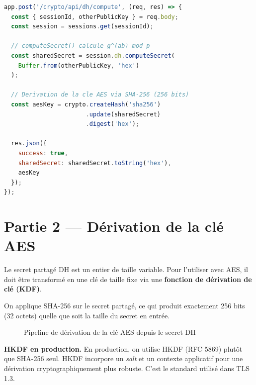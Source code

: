 \documentclass[12pt,a4paper]{report}
\begin{document}
\begin{lstlisting}[language=JavaScript, caption={Calcul du secret partagé — routes.js}]
app.post('/crypto/api/dh/compute', (req, res) => {
  const { sessionId, otherPublicKey } = req.body;
  const session = sessions.get(sessionId);

  // computeSecret() calcule g^(ab) mod p
  const sharedSecret = session.dh.computeSecret(
    Buffer.from(otherPublicKey, 'hex')
  );

  // Derivation de la cle AES via SHA-256 (256 bits)
  const aesKey = crypto.createHash('sha256')
                       .update(sharedSecret)
                       .digest('hex');

  res.json({
    success: true,
    sharedSecret: sharedSecret.toString('hex'),
    aesKey
  });
});
\end{lstlisting}

\section{Partie 2 — Dérivation de la clé AES}

Le secret partagé DH est un entier de taille variable. Pour l'utiliser
avec AES, il doit être transformé en une clé de taille fixe via une
\textbf{fonction de dérivation de clé (KDF)}.

On applique SHA-256 sur le secret partagé, ce qui produit exactement
256 bits (32 octets) quelle que soit la taille du secret en entrée.

\begin{figure}[h]
\centering
{}
\caption{Pipeline de dérivation de la clé AES depuis le secret DH}
\end{figure}

\begin{notebox}
  \textbf{HKDF en production.}
  En production, on utilise HKDF (RFC 5869) plutôt que SHA-256 seul.
  HKDF incorpore un \textit{salt} et un contexte applicatif pour une
  dérivation cryptographiquement plus robuste. C'est le standard
  utilisé dans TLS 1.3.
\end{notebox}
\end{document}
